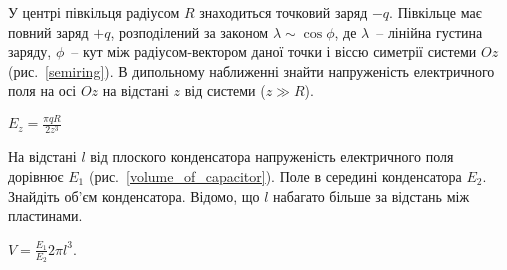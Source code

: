 

\begin{problem}\label{prb:semiring}
У центрі півкільця радіусом $R$ знаходиться точковий заряд $-q$. Півкільце має повний заряд $+ q$, розподілений за законом $\lambda\sim\cos\phi $, де $\lambda$~-- лінійна густина заряду, $\phi$~-- кут між радіусом-вектором даної точки і віссю симетрії системи $Oz$ (рис.~\ref{semiring}). В дипольному наближенні знайти напруженість електричного поля на осі $Oz$ на відстані $z$ від системи ($z \gg R$).
\begin{solution}
	$E_z = \frac{\pi qR}{2z^3}$
\end{solution}
\end{problem}

\begin{problem}\label{prb:volume_of_capacitor}
На відстані $l$ від плоского конденсатора напруженість електричного поля дорівнює $E_1$ (рис.~\ref{volume_of_capacitor}). Поле в середині конденсатора $E_2$. Знайдіть об'єм конденсатора. Відомо, що $l$ набагато більше за відстань між пластинами.
\begin{solution}
	$V = \frac{E_1}{E_2}2\pi l^3$.
\end{solution}
\end{problem}

